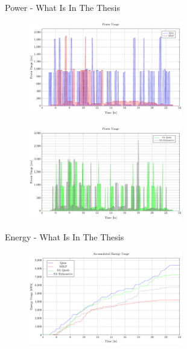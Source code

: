\documentclass[bigger]{beamer}
\begin{document}
\begin{frame}[label={sec:org33210fe}]{Power - What Is In The Thesis}
\begin{figure}[htpb]
\centering
    \includegraphics[width=0.6\textwidth]{img/sa-pap-paper-bad/power-milp-qin}
\end{figure}
\begin{figure}[htpb]
\centering
    \includegraphics[width=0.6\textwidth]{img/sa-pap-paper-bad/power-sa}
\end{figure}
\end{frame}
\begin{frame}[label={sec:org0deb8bc}]{Energy - What Is In The Thesis}
\begin{figure}[htpb]
\centering
    \includegraphics[width=0.6\textwidth]{img/sa-pap-paper-bad/energy}
\end{figure}
\end{frame}
\end{document}
